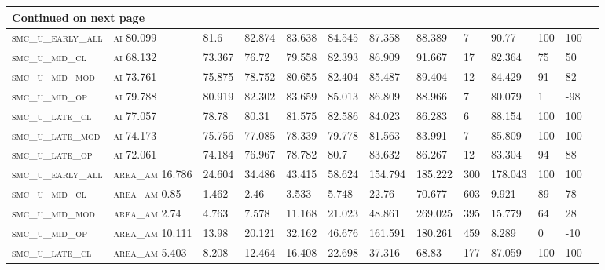 \begin{landscape}
\begin{center}
\begin{footnotesize}
\begin{longtable}{lllllllllllll}
\hline \multicolumn{13}{|l|}{{Continued on next page}} \\ \hline
\endfoot

\hline \hline
\endlastfoot

\textsc{smc\_u\_early\_all} & \textsc{ai        }   80.099   & 81.6     & 82.874   & 83.638   & 84.545   & 87.358   & 88.389   & 7    & 90.77    & 100 & 100  \\
\textsc{smc\_u\_mid\_cl   } & \textsc{ai        }   68.132   & 73.367   & 76.72    & 79.558   & 82.393   & 86.909   & 91.667   & 17   & 82.364   & 75  & 50   \\
\textsc{smc\_u\_mid\_mod  } & \textsc{ai        }   73.761   & 75.875   & 78.752   & 80.655   & 82.404   & 85.487   & 89.404   & 12   & 84.429   & 91  & 82   \\
\textsc{smc\_u\_mid\_op   } & \textsc{ai        }   79.788   & 80.919   & 82.302   & 83.659   & 85.013   & 86.809   & 88.966   & 7    & 80.079   & 1   & -98  \\
\textsc{smc\_u\_late\_cl  } & \textsc{ai        }   77.057   & 78.78    & 80.31    & 81.575   & 82.586   & 84.023   & 86.283   & 6    & 88.154   & 100 & 100  \\
\textsc{smc\_u\_late\_mod } & \textsc{ai        }   74.173   & 75.756   & 77.085   & 78.339   & 79.778   & 81.563   & 83.991   & 7    & 85.809   & 100 & 100  \\
\textsc{smc\_u\_late\_op  } & \textsc{ai        }   72.061   & 74.184   & 76.967   & 78.782   & 80.7     & 83.632   & 86.267   & 12   & 83.304   & 94  & 88   \\
\textsc{smc\_u\_early\_all} & \textsc{area\_am  }   16.786   & 24.604   & 34.486   & 43.415   & 58.624   & 154.794  & 185.222  & 300  & 178.043  & 100 & 100  \\
\textsc{smc\_u\_mid\_cl   } & \textsc{area\_am  }   0.85     & 1.462    & 2.46     & 3.533    & 5.748    & 22.76    & 70.677   & 603  & 9.921    & 89  & 78   \\
\textsc{smc\_u\_mid\_mod  } & \textsc{area\_am  }   2.74     & 4.763    & 7.578    & 11.168   & 21.023   & 48.861   & 269.025  & 395  & 15.779   & 64  & 28   \\
\textsc{smc\_u\_mid\_op   } & \textsc{area\_am  }   10.111   & 13.98    & 20.121   & 32.162   & 46.676   & 161.591  & 180.261  & 459  & 8.289    & 0   & -10  \\
\textsc{smc\_u\_late\_cl  } & \textsc{area\_am  }   5.403    & 8.208    & 12.464   & 16.408   & 22.698   & 37.316   & 68.83    & 177  & 87.059   & 100 & 100  \\

\end{longtable}
\end{footnotesize}
\end{center}
\end{landscape}
